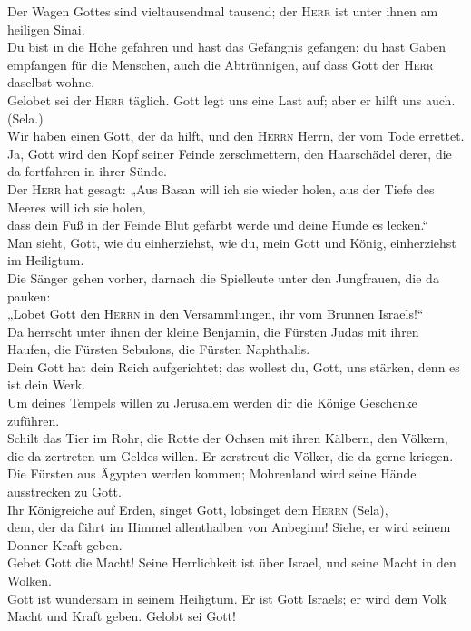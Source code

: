  Der Wagen Gottes sind vieltausendmal tausend; der
\textsc{Herr} ist unter ihnen am heiligen Sinai.\\
 Du bist in die Höhe gefahren und hast das Gefängnis
gefangen; du hast Gaben empfangen für die Menschen, auch die
Abtrünnigen, auf dass Gott der \textsc{Herr} daselbst wohne.\\
 Gelobet sei der \textsc{Herr} täglich. Gott legt uns
eine Last auf; aber er hilft uns auch. (Sela.)\\
 Wir haben einen Gott, der da hilft, und den
\textsc{Herrn} Herrn, der vom Tode errettet.\\
 Ja, Gott wird den Kopf seiner Feinde zerschmettern, den
Haarschädel derer, die da fortfahren in ihrer Sünde.\\
 Der \textsc{Herr} hat gesagt: „Aus Basan will ich sie
wieder holen, aus der Tiefe des Meeres will ich sie holen,\\
 dass dein Fuß in der Feinde Blut gefärbt werde und deine
Hunde es lecken.``\\
 Man sieht, Gott, wie du einherziehst, wie du, mein Gott
und König, einherziehst im Heiligtum.\\
 Die Sänger gehen vorher, darnach die Spielleute unter
den Jungfrauen, die da pauken:\\
 „Lobet Gott den \textsc{Herrn} in den Versammlungen, ihr
vom Brunnen Israels!{}``\\
 Da herrscht unter ihnen der kleine Benjamin, die Fürsten
Judas mit ihren Haufen, die Fürsten Sebulons, die Fürsten Naphthalis.\\
 Dein Gott hat dein Reich aufgerichtet; das wollest du,
Gott, uns stärken, denn es ist dein Werk.\\
 Um deines Tempels willen zu Jerusalem werden dir die
Könige Geschenke zuführen.\\
 Schilt das Tier im Rohr, die Rotte der Ochsen mit ihren
Kälbern, den Völkern, die da zertreten um Geldes willen. Er zerstreut
die Völker, die da gerne kriegen.\\
 Die Fürsten aus Ägypten werden kommen; Mohrenland wird
seine Hände ausstrecken zu Gott.\\
 Ihr Königreiche auf Erden, singet Gott, lobsinget dem
\textsc{Herrn} (Sela),\\
 dem, der da fährt im Himmel allenthalben von Anbeginn!
Siehe, er wird seinem Donner Kraft geben.\\
 Gebet Gott die Macht! Seine Herrlichkeit ist über
Israel, und seine Macht in den Wolken.\\
 Gott ist wundersam in seinem Heiligtum. Er ist Gott
Israels; er wird dem Volk Macht und Kraft geben. Gelobt sei Gott!

